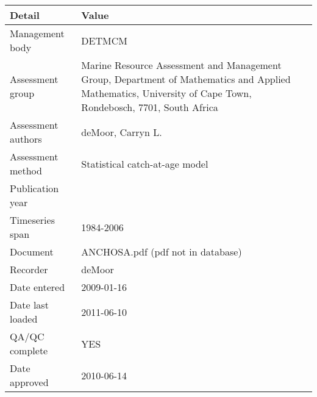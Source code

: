 \begin{table}[htb]
\centering
\begin{tabular}{lp{7cm}}
\toprule
Detail & Value \\
\midrule
Management body    & DETMCM                                                                                                                                                      \\
Assessment group   & Marine Resource Assessment and Management Group, Department of Mathematics and Applied Mathematics, University of Cape Town, Rondebosch, 7701, South Africa \\
Assessment authors & deMoor, Carryn L.                                                                                                                                           \\
Assessment method  & Statistical catch-at-age model                                                                                                                              \\
Publication year   &                                                                                                                                                             \\
Timeseries span    & 1984-2006                                                                                                                                                   \\
Document           & ANCHOSA.pdf (pdf not in database)                                                                                                                           \\
Recorder           & deMoor                                                                                                                                                      \\
Date entered       & 2009-01-16                                                                                                                                                  \\
Date last loaded   & 2011-06-10                                                                                                                                                  \\
QA/QC complete     & YES                                                                                                                                                         \\
Date approved      & 2010-06-14                                                                                                                                                  \\
\bottomrule
\end{tabular}
\label{tab:assessdet}
\end{table}
